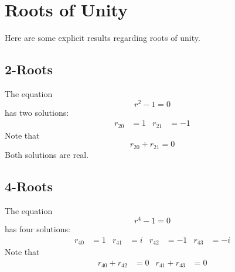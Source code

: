 \chapter{Roots of Unity}
Here are some explicit results regarding roots of unity.
\section{2-Roots}
The equation
\begin{equation}
    r^{2} - 1 = 0
\end{equation}
has two solutions:
\begin{align}
    r_{20} &= 1 & r_{21} &= {-1}
\end{align}
Note that
\begin{equation}
    r_{20} + r_{21} = 0
\end{equation}
Both solutions are real.
\section{4-Roots}
The equation
\begin{equation}
    r^{4} - 1 = 0
\end{equation}
has four solutions:
\begin{align}
    r_{40} &= 1 & r_{41} &= i & r_{42} &= -1 & r_{43} &= -i
\end{align}
Note that
\begin{align}
    r_{40} + r_{42} &= 0 & r_{41} + r_{43} &= 0
\end{align}
